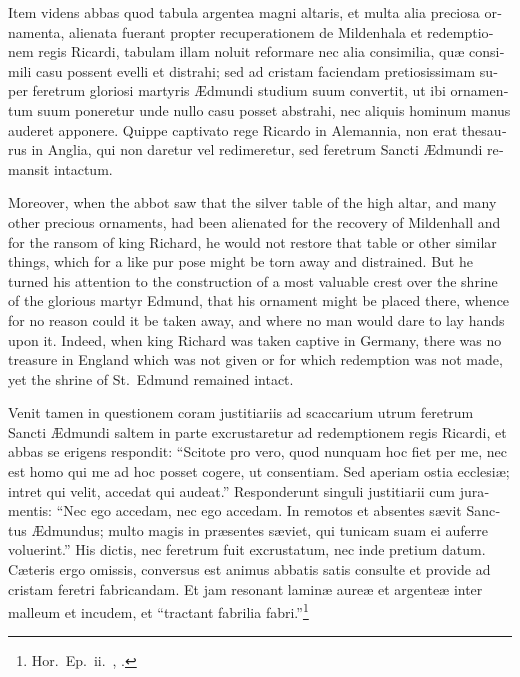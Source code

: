 \documentclass[10pt]{book}
\begin{document}
\begin{paracol}{2}
\switchcolumn*

\begin{otherlanguage}{latin}
Item videns abbas quod tabula argentea magni altaris, et multa alia preciosa ornamenta, alienata fuerant propter recuperationem de Mildenhala et redemptionem regis Ricardi, tabulam illam noluit reformare nec alia consimilia, qu\ae{} consimili casu possent evelli et distrahi; sed ad cristam faciendam pretiosissimam super feretrum gloriosi martyris \AE{}dmundi studium suum convertit, ut ibi ornamentum suum poneretur unde nullo casu posset abstrahi, nec aliquis hominum manus auderet apponere. Quippe captivato rege Ricardo in Alemannia, non erat thesaurus in Anglia, qui non daretur vel redimeretur, sed feretrum Sancti \AE{}dmundi remansit intactum.
\end{otherlanguage}

\switchcolumn

Moreover, when the abbot saw that the silver table of the high altar, and many other precious ornaments, had been alienated for the recovery of Mildenhall and for the ransom of king Richard, he would not restore that table or other similar things, which for a like pur pose might be torn away and distrained. But he turned his attention to the construction of a most valuable crest over the shrine of the glorious martyr Edmund, that his ornament might be placed there, whence for no reason could it be taken away, and where no man would dare to lay hands upon it. Indeed, when king Richard was taken captive in Germany, there was no treasure in England which was not given or for which redemption was not made, yet the shrine of St.\ Edmund remained intact.

\switchcolumn*

\begin{otherlanguage}{latin}
Venit tamen in questionem coram justitiariis ad scaccarium utrum feretrum Sancti \AE{}dmundi saltem in parte excrustaretur ad redemptionem regis Ricardi, et abbas se erigens respondit: ``Scitote pro vero, quod nunquam hoc fiet per me, nec est homo qui me ad hoc posset cogere, ut consentiam. Sed aperiam ostia ecclesi\ae{}; intret qui velit, accedat qui audeat.'' Responderunt singuli justitiarii cum juramentis: ``Nec ego accedam, nec ego accedam. In remotos et absentes s\ae{}vit Sanctus \AE{}dmundus; multo magis in pr\ae{}sentes s\ae{}viet, qui tunicam suam ei auferre voluerint.'' His dictis, nec feretrum fuit excrustatum, nec inde pretium datum. C\ae{}teris ergo omissis, conversus est animus abbatis satis consulte et provide ad cristam feretri fabricandam. Et jam resonant lamin\ae{} aure\ae{} et argente\ae{} inter malleum et incudem, et ``tractant fabrilia fabri.''\footnote[\textdagger]{Hor.\ Ep.\ ii.\ , .}
\end{otherlanguage}


\end{paracol}
\end{document}
